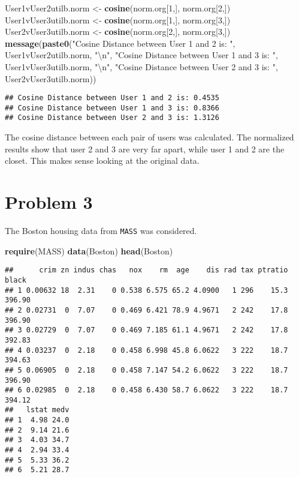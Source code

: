 \documentclass[]{article}
\newenvironment{Shaded}{\begin{snugshade}}{\end{snugshade}}
\newcommand{\KeywordTok}[1]{\textcolor[rgb]{0.13,0.29,0.53}{\textbf{{#1}}}}
\newcommand{\DecValTok}[1]{\textcolor[rgb]{0.00,0.00,0.81}{{#1}}}
\newcommand{\CharTok}[1]{\textcolor[rgb]{0.31,0.60,0.02}{{#1}}}
\newcommand{\StringTok}[1]{\textcolor[rgb]{0.31,0.60,0.02}{{#1}}}
\newcommand{\NormalTok}[1]{{#1}}
\begin{document}
\begin{Shaded}
\begin{Highlighting}[]
\NormalTok{User1vUser2utilb.norm <-}\StringTok{ }\KeywordTok{cosine}\NormalTok{(norm.org[}\DecValTok{1}\NormalTok{,], norm.org[}\DecValTok{2}\NormalTok{,])}
\NormalTok{User1vUser3utilb.norm <-}\StringTok{ }\KeywordTok{cosine}\NormalTok{(norm.org[}\DecValTok{1}\NormalTok{,], norm.org[}\DecValTok{3}\NormalTok{,])}
\NormalTok{User2vUser3utilb.norm <-}\StringTok{ }\KeywordTok{cosine}\NormalTok{(norm.org[}\DecValTok{2}\NormalTok{,], norm.org[}\DecValTok{3}\NormalTok{,])}
\KeywordTok{message}\NormalTok{(}\KeywordTok{paste0}\NormalTok{(}\StringTok{"Cosine Distance between User 1 and 2 is: "}\NormalTok{, User1vUser2utilb.norm, }\StringTok{"}\CharTok{\textbackslash{}n}\StringTok{"}\NormalTok{,}
               \StringTok{"Cosine Distance between User 1 and 3 is: "}\NormalTok{, User1vUser3utilb.norm, }\StringTok{"}\CharTok{\textbackslash{}n}\StringTok{"}\NormalTok{,}
               \StringTok{"Cosine Distance between User 2 and 3 is: "}\NormalTok{, User2vUser3utilb.norm))}
\end{Highlighting}
\end{Shaded}

\begin{verbatim}
## Cosine Distance between User 1 and 2 is: 0.4535
## Cosine Distance between User 1 and 3 is: 0.8366
## Cosine Distance between User 2 and 3 is: 1.3126
\end{verbatim}

The cosine distance between each pair of users was calculated. The
normalized results show that user 2 and 3 are very far apart, while user
1 and 2 are the closet. This makes sense looking at the original data.

\section{Problem 3}\label{problem-3}

The Boston housing data from \texttt{MASS} was considered.

\begin{Shaded}
\begin{Highlighting}[]
\KeywordTok{require}\NormalTok{(MASS)}
\KeywordTok{data}\NormalTok{(Boston)}
\KeywordTok{head}\NormalTok{(Boston)}
\end{Highlighting}
\end{Shaded}

\begin{verbatim}
##      crim zn indus chas   nox    rm  age    dis rad tax ptratio  black
## 1 0.00632 18  2.31    0 0.538 6.575 65.2 4.0900   1 296    15.3 396.90
## 2 0.02731  0  7.07    0 0.469 6.421 78.9 4.9671   2 242    17.8 396.90
## 3 0.02729  0  7.07    0 0.469 7.185 61.1 4.9671   2 242    17.8 392.83
## 4 0.03237  0  2.18    0 0.458 6.998 45.8 6.0622   3 222    18.7 394.63
## 5 0.06905  0  2.18    0 0.458 7.147 54.2 6.0622   3 222    18.7 396.90
## 6 0.02985  0  2.18    0 0.458 6.430 58.7 6.0622   3 222    18.7 394.12
##   lstat medv
## 1  4.98 24.0
## 2  9.14 21.6
## 3  4.03 34.7
## 4  2.94 33.4
## 5  5.33 36.2
## 6  5.21 28.7
\end{verbatim}
\end{document}
